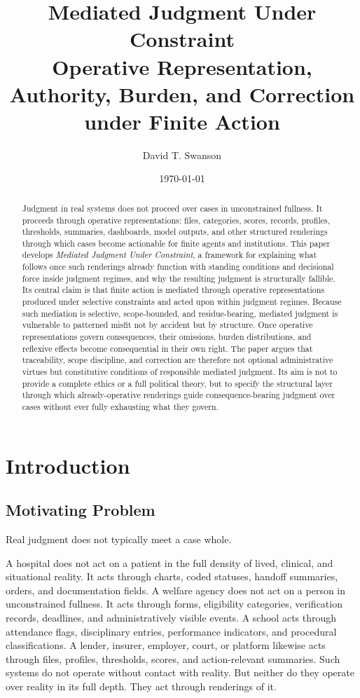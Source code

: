 \documentclass[11pt]{article}
\title{\textbf{Mediated Judgment Under Constraint}\\
\large Operative Representation, Authority, Burden, and Correction under Finite Action}
\author{David T. Swanson}
\date{\today}
\renewcommand{\emph}[1]{\textit{#1}}
\begin{document}
\maketitle

\begin{abstract}
Judgment in real systems does not proceed over cases in unconstrained fullness. It proceeds through operative representations: files, categories, scores, records, profiles, thresholds, summaries, dashboards, model outputs, and other structured renderings through which cases become actionable for finite agents and institutions. This paper develops \emph{Mediated Judgment Under Constraint}, a framework for explaining what follows once such renderings already function with standing conditions and decisional force inside judgment regimes, and why the resulting judgment is structurally fallible. Its central claim is that finite action is mediated through operative representations produced under selective constraints and acted upon within judgment regimes. Because such mediation is selective, scope-bounded, and residue-bearing, mediated judgment is vulnerable to patterned misfit not by accident but by structure. Once operative representations govern consequences, their omissions, burden distributions, and reflexive effects become consequential in their own right. The paper argues that traceability, scope discipline, and correction are therefore not optional administrative virtues but constitutive conditions of responsible mediated judgment. Its aim is not to provide a complete ethics or a full political theory, but to specify the structural layer through which already-operative renderings guide consequence-bearing judgment over cases without ever fully exhausting what they govern.
\end{abstract}
\pagebreak
\section{Introduction}

\subsection{Motivating Problem}

Real judgment does not typically meet a case whole.

A hospital does not act on a patient in the full density of lived, clinical, and situational reality. It acts through charts, coded statuses, handoff summaries, orders, and documentation fields. A welfare agency does not act on a person in unconstrained fullness. It acts through forms, eligibility categories, verification records, deadlines, and administratively visible events. A school acts through attendance flags, disciplinary entries, performance indicators, and procedural classifications. A lender, insurer, employer, court, or platform likewise acts through files, profiles, thresholds, scores, and action-relevant summaries. Such systems do not operate without contact with reality. But neither do they operate over reality in its full depth. They act through renderings of it.
\end{document}
